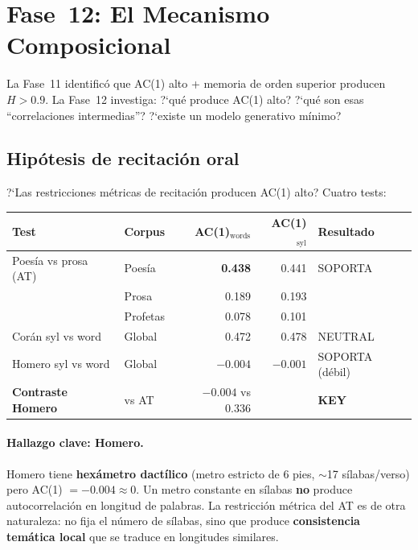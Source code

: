 \documentclass[12pt,a4paper]{article}
\newcommand{\val}[1]{\textcolor{hlcolor}{\textbf{#1}}}
\begin{document}
\section{Fase~12: El Mecanismo Composicional}

La Fase~11 identific\'o que AC(1) alto + memoria de orden superior producen
$H > 0.9$. La Fase~12 investiga: ?`qu\'e produce AC(1) alto? ?`qu\'e son esas
``correlaciones intermedias''? ?`existe un modelo generativo m\'inimo?

\subsection{Hip\'otesis de recitaci\'on oral}

?`Las restricciones m\'etricas de recitaci\'on producen AC(1) alto?
Cuatro tests:

\begin{center}\small
\begin{tabular}{llrrl}
\toprule
Test & Corpus & AC(1)$_\text{words}$ & AC(1)$_\text{syl}$ & Resultado \\
\midrule
Poes\'ia vs prosa (AT) & Poes\'ia & \val{0.438} & 0.441 & SOPORTA \\
                        & Prosa   & 0.189 & 0.193 & \\
                        & Profetas & 0.078 & 0.101 & \\
Cor\'an syl vs word      & Global  & 0.472 & 0.478 & NEUTRAL \\
Homero syl vs word      & Global  & $-0.004$ & $-0.001$ & SOPORTA (d\'ebil) \\
\textbf{Contraste Homero} & vs AT & $-0.004$ vs $0.336$ & & \textbf{KEY} \\
\bottomrule
\end{tabular}
\end{center}

\paragraph{Hallazgo clave: Homero.}
Homero tiene \textbf{hex\'ametro dact\'ilico} (metro estricto de 6 pies, $\sim$17 s\'ilabas/verso)
pero AC(1) $= -0.004 \approx 0$. Un metro constante en s\'ilabas \textbf{no} produce
autocorrelaci\'on en longitud de palabras. La restricci\'on m\'etrica del AT
es de otra naturaleza: no fija el n\'umero de s\'ilabas, sino que produce
\textbf{consistencia tem\'atica local} que se traduce en longitudes similares.
\end{document}
